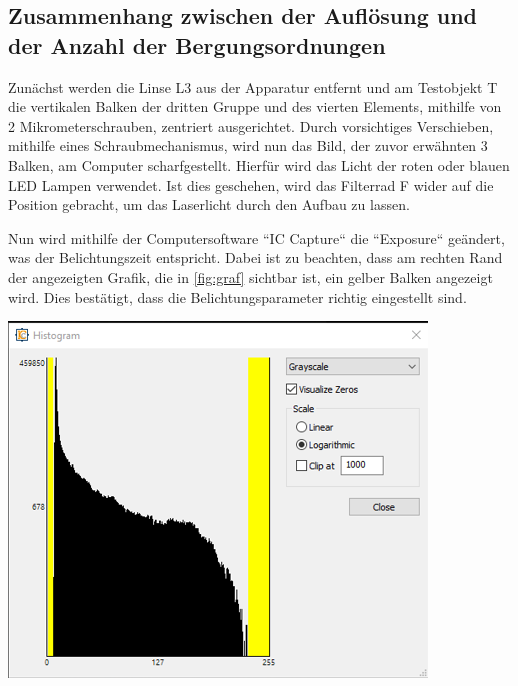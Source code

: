\documentclass[11pt,ngerman]{scrartcl}
\begin{document}


\subsection{Zusammenhang zwischen der Auflösung und der Anzahl der Bergungsordnungen}

\noindent Zunächst werden die Linse L3 aus der Apparatur entfernt und am Testobjekt T die vertikalen Balken der dritten Gruppe und des vierten Elements, mithilfe von 2 Mikrometerschrauben, zentriert ausgerichtet. Durch vorsichtiges Verschieben, mithilfe eines Schraubmechanismus, wird nun das Bild, der zuvor erwähnten 3 Balken, am Computer scharfgestellt. Hierfür wird das Licht der roten oder blauen LED Lampen verwendet. Ist dies geschehen, wird das Filterrad F wider auf die Position gebracht, um das Laserlicht durch den Aufbau zu lassen.

\vspace{2mm}

\noindent Nun wird mithilfe der Computersoftware ``IC Capture`` die ``Exposure`` geändert, was der Belichtungszeit entspricht. Dabei ist zu beachten, dass am rechten Rand der angezeigten Grafik, die in \autoref{fig:graf} sichtbar ist, ein gelber Balken angezeigt wird. Dies bestätigt, dass die Belichtungsparameter richtig eingestellt sind.

\begin{center}
	\begin{minipage}[t]{0.7\textwidth}
		\includegraphics[width=\textwidth]{graf}
		\label{fig:graf}
	\end{minipage}
\end{center}
\end{document}
